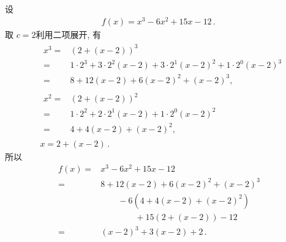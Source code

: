 \begin{example}
    设
    \begin{align*}
        f(x) = x^3 - 6x^2 + 15x - 12 \period
    \end{align*}
    取 $c = 2$\period 利用二项展开, 有
    \begin{align*}
         & \begin{aligned}
            x^3
            = {} & (2 + (x - 2))^3                                                             \\
            = {} & 1 \cdot 2^3 + 3 \cdot 2^2 (x-2) + 3 \cdot 2^1 (x-2)^2 + 1 \cdot 2^0 (x-2)^3 \\
            = {} & 8 + 12(x-2) + 6(x-2)^2 + (x-2)^3,
        \end{aligned} \\
         & \begin{aligned}
            x^2
            = {} & (2 + (x - 2))^2                                       \\
            = {} & 1 \cdot 2^2 + 2 \cdot 2^1 (x-2) + 1 \cdot 2^0 (x-2)^2 \\
            = {} & 4 + 4(x-2) + (x-2)^2,
        \end{aligned} \\
         & x = 2 + (x-2) \period
    \end{align*}
    所以
    \begin{align*}
        f(x)
        = {} & x^3 - 6x^2 + 15x - 12              \\
        = {} & 8 + 12(x-2) + 6(x-2)^2 + (x-2)^3   \\
             & \qquad - 6(4 + 4(x-2) + (x-2)^2)   \\
             & \qquad \qquad + 15(2 + (x-2)) - 12 \\
        = {} & (x-2)^3 + 3(x-2) + 2 \period
    \end{align*}
\end{example}
